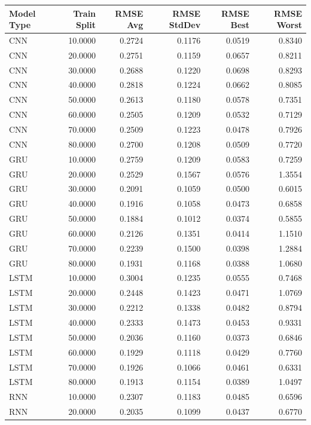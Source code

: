 \begin{tabular}{lrrrrr}
\toprule
Model Type & Train Split & RMSE Avg & RMSE StdDev & RMSE Best & RMSE Worst \\
\midrule
CNN & 10.0000 & 0.2724 & 0.1176 & 0.0519 & 0.8340 \\
CNN & 20.0000 & 0.2751 & 0.1159 & 0.0657 & 0.8211 \\
CNN & 30.0000 & 0.2688 & 0.1220 & 0.0698 & 0.8293 \\
CNN & 40.0000 & 0.2818 & 0.1224 & 0.0662 & 0.8085 \\
CNN & 50.0000 & 0.2613 & 0.1180 & 0.0578 & 0.7351 \\
CNN & 60.0000 & 0.2505 & 0.1209 & 0.0532 & 0.7129 \\
CNN & 70.0000 & 0.2509 & 0.1223 & 0.0478 & 0.7926 \\
CNN & 80.0000 & 0.2700 & 0.1208 & 0.0509 & 0.7720 \\
GRU & 10.0000 & 0.2759 & 0.1209 & 0.0583 & 0.7259 \\
GRU & 20.0000 & 0.2529 & 0.1567 & 0.0576 & 1.3554 \\
GRU & 30.0000 & 0.2091 & 0.1059 & 0.0500 & 0.6015 \\
GRU & 40.0000 & 0.1916 & 0.1058 & 0.0473 & 0.6858 \\
GRU & 50.0000 & 0.1884 & 0.1012 & 0.0374 & 0.5855 \\
GRU & 60.0000 & 0.2126 & 0.1351 & 0.0414 & 1.1510 \\
GRU & 70.0000 & 0.2239 & 0.1500 & 0.0398 & 1.2884 \\
GRU & 80.0000 & 0.1931 & 0.1168 & 0.0388 & 1.0680 \\
LSTM & 10.0000 & 0.3004 & 0.1235 & 0.0555 & 0.7468 \\
LSTM & 20.0000 & 0.2448 & 0.1423 & 0.0471 & 1.0769 \\
LSTM & 30.0000 & 0.2212 & 0.1338 & 0.0482 & 0.8794 \\
LSTM & 40.0000 & 0.2333 & 0.1473 & 0.0453 & 0.9331 \\
LSTM & 50.0000 & 0.2036 & 0.1160 & 0.0373 & 0.6846 \\
LSTM & 60.0000 & 0.1929 & 0.1118 & 0.0429 & 0.7760 \\
LSTM & 70.0000 & 0.1926 & 0.1066 & 0.0461 & 0.6331 \\
LSTM & 80.0000 & 0.1913 & 0.1154 & 0.0389 & 1.0497 \\
RNN & 10.0000 & 0.2307 & 0.1183 & 0.0485 & 0.6596 \\
RNN & 20.0000 & 0.2035 & 0.1099 & 0.0437 & 0.6770 \\

\end{tabular}
